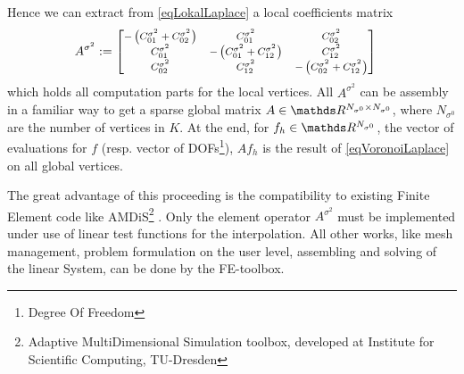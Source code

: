         Hence we can extract from \eqref{eqLokalLaplace} a local coefficients matrix
        \begin{align}
          A^{\sigma^{2}} 
              &:= {\footnotesize\begin{bmatrix}
                    -\left( C^{\sigma^{2}}_{01} + C^{\sigma^{2}}_{02}\right) & C^{\sigma^{2}}_{01} & C^{\sigma^{2}}_{02} \\
                    C^{\sigma^{2}}_{01} & -\left( C^{\sigma^{2}}_{01} + C^{\sigma^{2}}_{12}\right) & C^{\sigma^{2}}_{12} \\
                    C^{\sigma^{2}}_{02} & C^{\sigma^{2}}_{12} & -\left( C^{\sigma^{2}}_{02} + C^{\sigma^{2}}_{12}\right)
                  \end{bmatrix}} 
        \end{align}
        which holds all computation parts for the local vertices.
        All \( A^{\sigma^{2}} \) can be assembly in a familiar way to get a sparse global matrix 
        \( A\in\R^{N_{\sigma^{0}} \times N_{\sigma^{0}}} \), where \( N_{\sigma^{0}} \) are the number of vertices in \( K \).
        At the end, for \( f_{h}\in\R^{N_{\sigma^{0}}} \), the vector of evaluations for \( f \) 
        (resp. vector of DOFs\footnote{Degree Of Freedom}), 
        \( Af_{h} \) is the result of \eqref{eqVoronoiLaplace} on all global vertices.

        The great advantage of this proceeding is the compatibility to existing Finite Element code 
        like AMDiS\footnote{Adaptive MultiDimensional Simulation toolbox, developed at Institute for Scientific Computing, TU-Dresden}
        \cite{amdis}.
        Only the element operator \( A^{\sigma^{2}} \) must be implemented 
        under use of linear test functions for the interpolation. 
        All other works, like mesh management, problem formulation on the user level, assembling and solving of the linear System, 
        can be done by the FE-toolbox.

